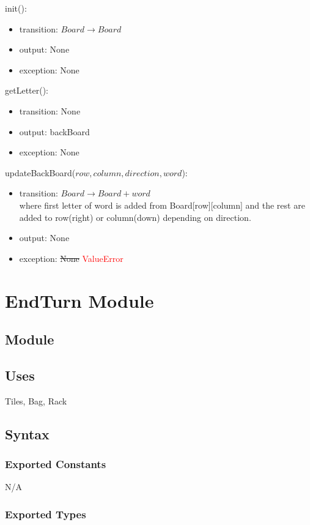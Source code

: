 \documentclass[12pt]{article}
\begin{document}
\noindent init():
\begin{itemize}
\item transition: $Board \rightarrow Board$ 
\item output: None
\item exception: None
\end{itemize}

\noindent getLetter():
\begin{itemize}
\item transition: None
\item output: backBoard
\item exception: None
\end{itemize}

\noindent updateBackBoard($row, column, direction, word$):
\begin{itemize}
\item transition: $Board \rightarrow Board + word$ \\
where first letter of word is added from Board[row][column] and the rest are added to row(right) or column(down) depending on direction.
\item output: None
\item exception: \sout{None} \textcolor{red}{ValueError}
\end{itemize}

\newpage

\section* {EndTurn Module}

\subsection*{Module}

\subsection* {Uses}

Tiles, Bag, Rack

\subsection* {Syntax}

\subsubsection* {Exported Constants}
N/A
\subsubsection* {Exported Types}
\end{document}
